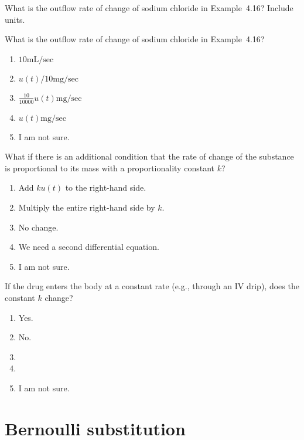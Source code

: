 \documentclass[t, 14pt]{beamer}
\begin{document}
\begin{frame}[c]
  What is the outflow rate of change of sodium chloride in Example~4.16? Include units.
\end{frame}

\begin{frame}[c]
  What is the outflow rate of change of sodium chloride in Example~4.16?

  \begin{enumerate}
    \item \(10 \text{mL}/\text{sec}\) 
    \item \(u(t)/10 \text{mg}/\text{sec}\) 
    \item \(\frac{10}{10000} u(t) \text{mg}/\text{sec}\) 
    \item \(u(t) \text{mg}/\text{sec}\) 
    \item I am not sure.
  \end{enumerate}
\end{frame}

\begin{frame}[c]
  What if there is an additional condition that the rate of change of the substance is proportional to its mass with a proportionality constant \(k\)?

  \begin{enumerate}
    \item Add \(k u(t)\) to the right-hand side.
    \item Multiply the entire right-hand side by \(k\).
    \item No change.
    \item We need a second differential equation.
    \item I am not sure.
  \end{enumerate}
\end{frame}

\begin{frame}[t]
  If the drug enters the body at a constant rate (e.g., through an IV drip), does the constant \(k\) change?

  \begin{enumerate}
    \item Yes.
    \item No.
    \item 
    \item
    \item I am not sure. 
  \end{enumerate}
\end{frame}
\section{Bernoulli substitution}
\end{document}
